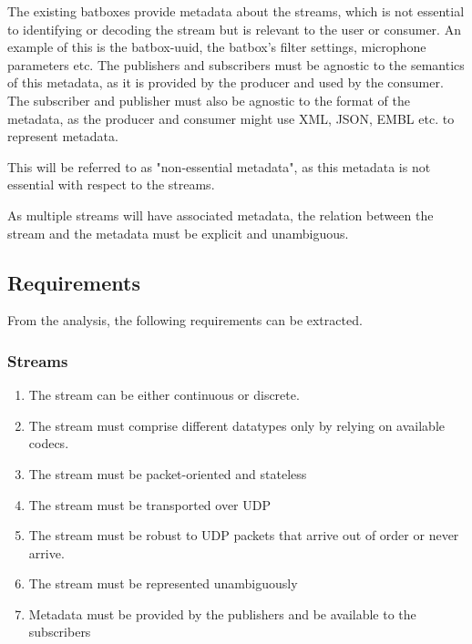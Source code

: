 The existing batboxes provide metadata about the streams, which is not essential to identifying or decoding the stream but is relevant to the user or consumer. An example of this is the batbox-uuid, the batbox's filter settings, microphone parameters etc. The publishers and subscribers must be agnostic to the semantics of this metadata, as it is provided by the producer and used by the consumer. The subscriber and publisher must also be agnostic to the format of the metadata, as the producer and consumer might use XML, JSON, EMBL etc. to represent metadata.

This will be referred to as "non-essential metadata", as this metadata is not essential with respect to the streams.

As multiple streams will have associated metadata, the relation between the stream and the metadata must be explicit and unambiguous.

\subsection{Requirements}
From the analysis, the following requirements can be extracted.
\subsubsection{Streams}
\begin{enumerate}
	\item The stream can be either continuous or discrete.
	\item The stream must comprise different datatypes only by relying on available codecs.
	\item The stream must be packet-oriented and stateless
	\item The stream must be transported over UDP
	\item The stream must be robust to UDP packets that arrive out of order or never arrive.
	\item The stream must be represented unambiguously
	\item Metadata must be provided by the publishers and be available to the subscribers 
\end{enumerate}
\todo{Table of requirements[Where it's defined][Where it's tested][Whether it passes}

